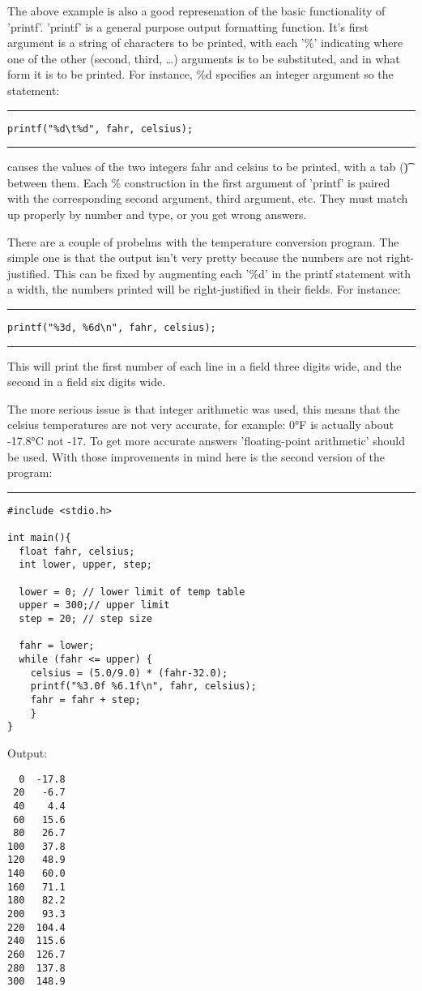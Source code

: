 \documentclass[a4paper]{article}
\begin{document}
The above example is also a good represenation of the basic functionality of
'printf'. 'printf' is a general purpose output formatting function. It's first
argument is a string of characters to be printed, with each '\%' indicating where
one of the other (second, third, \ldots{}) arguments is to be substituted, and in
what form it is to be printed. For instance, \%d specifies an integer argument so
the statement:

\noindent\rule{\textwidth}{0.5pt}
\begin{verbatim}
printf("%d\t%d", fahr, celsius);
\end{verbatim}

\noindent\rule{\textwidth}{0.5pt}
causes the values of the two integers fahr and celsius to be printed, with a tab
(\t) between them.
Each \% construction in the first argument of 'printf' is paired with the
corresponding second argument, third argument, etc. They must match up properly
by number and type, or you get wrong answers.

There are a couple of probelms with the temperature conversion program. The
simple one is that the output isn't very pretty because the numbers are not
right-justified. This can be fixed by augmenting each '\%d' in the printf
statement with a width, the numbers printed will be right-justified in their
fields.
For instance:

\noindent\rule{\textwidth}{0.5pt}
\begin{verbatim}
printf("%3d, %6d\n", fahr, celsius);
\end{verbatim}

\noindent\rule{\textwidth}{0.5pt}
This will print the first number of each line in a field three digits wide, and
the second in a field six digits wide.

The more serious issue is that integer arithmetic was used, this means that the
celsius temperatures are not very accurate, for example: 0°F is actually about
-17.8°C not -17. To get more accurate answers 'floating-point arithmetic' should
be used.
With those improvements in mind here is the second version of the program:

\noindent\rule{\textwidth}{0.5pt}
\begin{verbatim}
#include <stdio.h>

int main(){
  float fahr, celsius;
  int lower, upper, step;

  lower = 0; // lower limit of temp table
  upper = 300;// upper limit
  step = 20; // step size

  fahr = lower;
  while (fahr <= upper) {
    celsius = (5.0/9.0) * (fahr-32.0);
    printf("%3.0f %6.1f\n", fahr, celsius);
    fahr = fahr + step;
    }
}
\end{verbatim}
Output:
\begin{verbatim}
  0  -17.8
 20   -6.7
 40    4.4
 60   15.6
 80   26.7
100   37.8
120   48.9
140   60.0
160   71.1
180   82.2
200   93.3
220  104.4
240  115.6
260  126.7
280  137.8
300  148.9
\end{verbatim}
\end{document}
